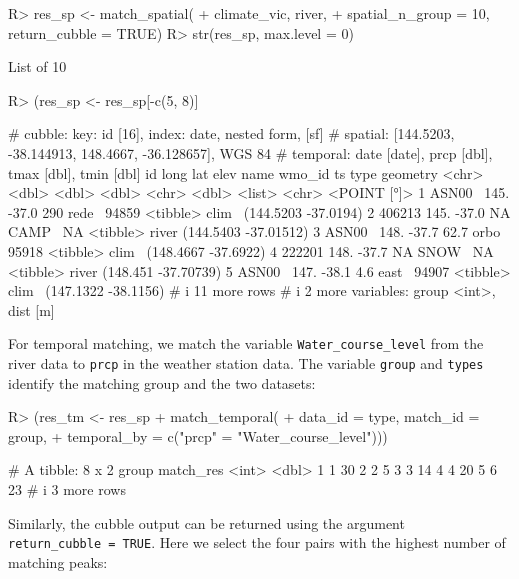 \documentclass[
  shortnames]{jss}
\begin{document}
\begin{CodeChunk}
\begin{CodeInput}
R> res_sp <- match_spatial(
+   climate_vic, river, 
+   spatial_n_group = 10, return_cubble = TRUE)
R> str(res_sp, max.level = 0)
\end{CodeInput}
\begin{CodeOutput}
List of 10
\end{CodeOutput}
\begin{CodeInput}
R> (res_sp <- res_sp[-c(5, 8)] %
\end{CodeInput}
\begin{CodeOutput}
# cubble:   key: id [16], index: date, nested form, [sf]
# spatial:  [144.5203, -38.144913, 148.4667, -36.128657], WGS 84
# temporal: date [date], prcp [dbl], tmax [dbl], tmin [dbl]
  id      long   lat  elev name  wmo_id ts       type              geometry
  <chr>  <dbl> <dbl> <dbl> <chr>  <dbl> <list>   <chr>          <POINT [°]>
1 ASN00~  145. -37.0 290   rede~  94859 <tibble> clim~  (144.5203 -37.0194)
2 406213  145. -37.0  NA   CAMP~     NA <tibble> river (144.5403 -37.01512)
3 ASN00~  148. -37.7  62.7 orbo~  95918 <tibble> clim~  (148.4667 -37.6922)
4 222201  148. -37.7  NA   SNOW~     NA <tibble> river  (148.451 -37.70739)
5 ASN00~  147. -38.1   4.6 east~  94907 <tibble> clim~  (147.1322 -38.1156)
# i 11 more rows
# i 2 more variables: group <int>, dist [m]
\end{CodeOutput}
\end{CodeChunk}

For temporal matching, we match the variable \texttt{Water\_course\_level} from the river data to \texttt{prcp} in the weather station data. The variable \texttt{group} and \texttt{types} identify the matching group and the two datasets:

\begin{CodeChunk}
\begin{CodeInput}
R> (res_tm <- res_sp %
+   match_temporal(
+     data_id = type, match_id = group,
+     temporal_by = c("prcp" = "Water_course_level")))
\end{CodeInput}
\begin{CodeOutput}
# A tibble: 8 x 2
  group match_res
  <int>     <dbl>
1     1        30
2     2         5
3     3        14
4     4        20
5     6        23
# i 3 more rows
\end{CodeOutput}
\end{CodeChunk}

Similarly, the cubble output can be returned using the argument \texttt{return\_cubble\ =\ TRUE}. Here we select the four pairs with the highest number of matching peaks:
\end{document}
